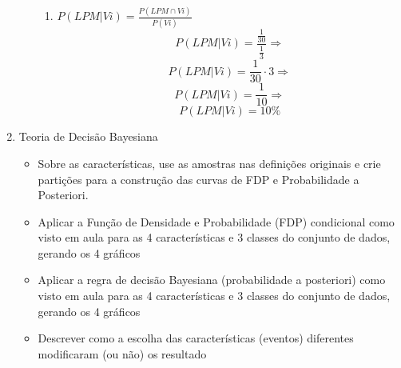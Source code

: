 \documentclass[a4paper, 12pt]{article}
\begin{document}
\begin{enumerate}
\begin{itemize}
\begin{enumerate}
  \item $P(LPM|Vi)=\frac{P(LPM \cap Vi)}{P(Vi)}$
   $$P(LPM|Vi)=\frac{\frac{1}{30}}{\frac{1}{3}} \Rightarrow$$
   $$P(LPM|Vi)=\frac{1}{30}\cdot3 \Rightarrow$$
   $$P(LPM|Vi)=\frac{1}{10} \Rightarrow$$
   $$P(LPM|Vi)=10\% $$
     
  \end{enumerate}
  

\end{itemize}
\item Teoria de Decisão Bayesiana
  \begin{itemize}
  \item Sobre as características, use as amostras nas definições originais e crie partições para a construção das curvas de FDP e Probabilidade a Posteriori.
  \item Aplicar a Função de Densidade e Probabilidade (FDP) condicional como visto em aula para as 4 características e 3 classes do conjunto de dados, gerando os 4 gráficos
  \item Aplicar a regra de decisão Bayesiana (probabilidade a posteriori) como visto em aula para as 4 características e 3 classes do conjunto de dados, gerando os 4 gráficos
  \item Descrever como a escolha das características (eventos) diferentes modificaram (ou não) os resultado
    
  \end{itemize}

\end{enumerate}
\end{document}

